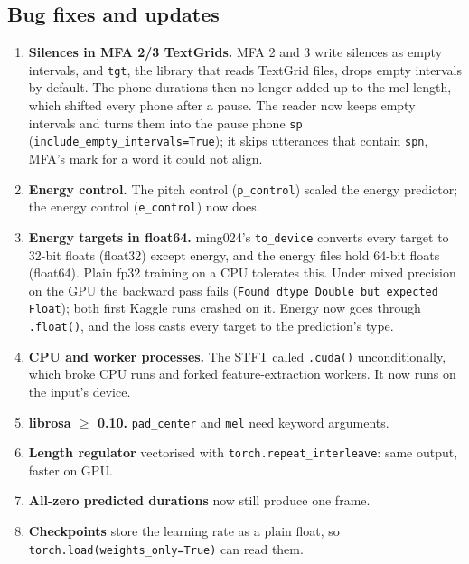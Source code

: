 \documentclass[11pt,a4paper]{article}
\newcommand{\code}[1]{\texttt{#1}}
\begin{document}
\subsection*{Bug fixes and updates}
\begin{enumerate}
\item \textbf{Silences in MFA 2/3 TextGrids.} MFA 2 and 3 write silences as empty intervals, and \code{tgt}, the library
that reads TextGrid files, drops empty intervals by default. The phone durations then no longer added up to the mel length, which shifted every
phone after a pause. The reader now keeps empty intervals and turns them into the pause phone \code{sp}
(\code{include\_empty\_intervals=True}); it skips utterances that contain \code{spn}, MFA's mark for a word it
could not align.
\item \textbf{Energy control.} The pitch control (\code{p\_control}) scaled the energy predictor; the energy control
(\code{e\_control}) now does.
\item \textbf{Energy targets in float64.} ming024's \code{to\_device} converts every target to 32-bit floats
(float32) except energy, and the energy files hold 64-bit floats (float64). Plain fp32 training on a CPU tolerates this. Under mixed precision on
the GPU the backward pass fails (\code{Found dtype Double but expected Float}); both first Kaggle runs crashed on it. Energy
now goes through \code{.float()}, and the loss casts every target to the prediction's type.
\item \textbf{CPU and worker processes.} The STFT called \code{.cuda()} unconditionally, which broke CPU runs and
forked feature-extraction workers. It now runs on the input's device.
\item \textbf{librosa $\geq$ 0.10.} \code{pad\_center} and \code{mel} need keyword arguments.
\item \textbf{Length regulator} vectorised with \code{torch.repeat\_interleave}: same output, faster on GPU.
\item \textbf{All-zero predicted durations} now still produce one frame.
\item \textbf{Checkpoints} store the learning rate as a plain float, so
\code{torch.load(weights\_only=True)} can read them.
\end{enumerate}
\end{document}

